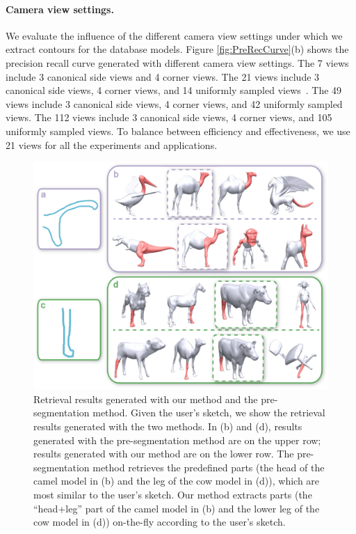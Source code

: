 \paragraph*{Camera view settings.} We evaluate the influence of the different camera view settings under which we extract contours for the database models. Figure \ref{fig:PreRecCurve}(b) shows the precision recall curve generated with different camera view settings. The 7 views include 3 canonical side views and 4 corner views. The 21 views include 3 canonical side views, 4 corner views, and 14 uniformly sampled views~\cite{FanWang2013}. The 49 views include 3 canonical side views, 4 corner views, and 42 uniformly sampled views. The 112 views include 3 canonical side views, 4 corner views, and 105 uniformly sampled views. To balance between efficiency and effectiveness, we use 21 views for all the experiments and applications.

\begin{figure}\centering
\includegraphics[width=0.9\linewidth]{./Material/Comp2PreSeg.pdf}
\caption{Retrieval results generated with our method and the pre-segmentation method. Given the user's sketch, we show the retrieval results generated with the two methods. In (b) and (d), results generated with the pre-segmentation method are on the upper row; results generated with our method are on the lower row. The pre-segmentation method retrieves the predefined parts (the head of the camel model in (b) and the leg of the cow model in (d)), which are most similar to the user's sketch. Our method extracts parts (the ``head+leg'' part of the camel model in (b) and the lower leg of the cow model in (d)) on-the-fly according to the user's sketch.}\label{fig:Comp2PreSeg}
\end{figure} 